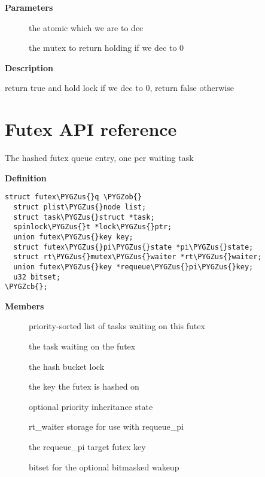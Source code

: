 \documentclass[a4paper,8pt,english]{sphinxmanual}
\def\PYGZus{\char`\_}
\def\PYGZob{\char`\{}
\def\PYGZcb{\char`\}}
\begin{document}
\textbf{Parameters}
\begin{description}
\item[{}] \leavevmode
the atomic which we are to dec

\item[{}] \leavevmode
the mutex to return holding if we dec to 0

\end{description}

\textbf{Description}

return true and hold lock if we dec to 0, return false otherwise


\section{Futex API reference}
\label{kernel-hacking/locking:futex-api-reference}

\begin{fulllineitems}
\label{kernel-hacking/locking:c.futex_q}
The hashed futex queue entry, one per waiting task

\end{fulllineitems}


\textbf{Definition}

\begin{Verbatim}[commandchars=\\\{\}]
struct futex\PYGZus{}q \PYGZob{}
  struct plist\PYGZus{}node list;
  struct task\PYGZus{}struct *task;
  spinlock\PYGZus{}t *lock\PYGZus{}ptr;
  union futex\PYGZus{}key key;
  struct futex\PYGZus{}pi\PYGZus{}state *pi\PYGZus{}state;
  struct rt\PYGZus{}mutex\PYGZus{}waiter *rt\PYGZus{}waiter;
  union futex\PYGZus{}key *requeue\PYGZus{}pi\PYGZus{}key;
  u32 bitset;
\PYGZcb{};
\end{Verbatim}

\textbf{Members}
\begin{description}
\item[{}] \leavevmode
priority-sorted list of tasks waiting on this futex

\item[{}] \leavevmode
the task waiting on the futex

\item[{}] \leavevmode
the hash bucket lock

\item[{}] \leavevmode
the key the futex is hashed on

\item[{}] \leavevmode
optional priority inheritance state

\item[{}] \leavevmode
rt\_waiter storage for use with requeue\_pi

\item[{}] \leavevmode
the requeue\_pi target futex key

\item[{}] \leavevmode
bitset for the optional bitmasked wakeup

\end{description}
\end{document}
